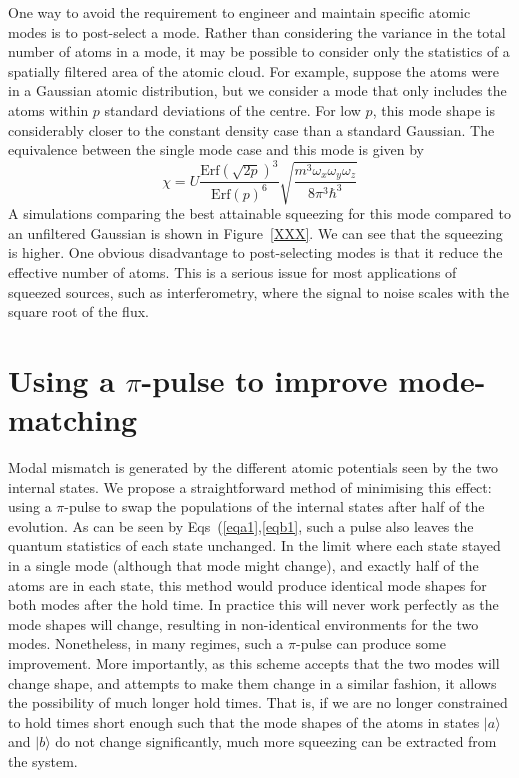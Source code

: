 \documentclass{iopart}
\begin{document}
One way to avoid the requirement to engineer and maintain specific atomic modes is to post-select a mode.  Rather than considering the variance in the total number of atoms in a mode, it may be possible to consider only the statistics of a spatially filtered area of the atomic cloud.  For example, suppose the atoms were in a Gaussian atomic distribution, but we consider a mode that only includes the atoms within $p$ standard deviations of the centre. For low $p$, this mode shape is considerably closer to the constant density case than a standard Gaussian. The equivalence between the single mode case and this mode is given by
\begin{equation}
\chi = U \frac{{\mathrm{Erf}} (\sqrt{2p})^3}{{\mathrm{Erf}}(p)^6} \sqrt{\frac{m^3 \omega_x \omega_y \omega_z}{8 \pi^3 \hbar^3}}
\end{equation}
A simulations comparing the best attainable squeezing for this mode compared to an unfiltered Gaussian is shown in Figure~\ref{XXX}.  We can see that the squeezing is higher.  One obvious disadvantage to post-selecting modes is that it  reduce the effective number of atoms.  This is a serious issue for most applications of squeezed sources, such as interferometry, where the signal to noise scales with the square root of the flux.

\section{Using a $\pi$-pulse to improve mode-matching}
Modal mismatch is generated by the different atomic potentials seen by the two internal states.  We propose a straightforward method of minimising this effect: using a $\pi$-pulse to swap the populations of the internal states after half of the evolution. As can be seen by Eqs~(\ref{eqa1},\ref{eqb1}, such a pulse also leaves the quantum statistics of each state unchanged. In the limit where each state stayed in a single mode (although that mode might change), and exactly half of the atoms are in each state, this method would produce identical mode shapes for both modes after the hold time. In practice this will never work perfectly as the mode shapes will change, resulting in non-identical environments for the two modes. Nonetheless, in many regimes, such a $\pi$-pulse can produce some improvement. More importantly, as this scheme accepts that the two modes will change shape, and attempts to make them change in a similar fashion, it allows the possibility of much longer hold times. That is, if we are no longer constrained to hold times short enough such that the mode shapes of the atoms in states $|a \rangle$ and $|b \rangle$ do not change significantly, much more squeezing can be extracted from the system.
\end{document}
